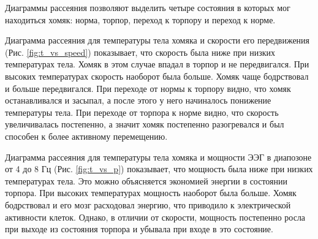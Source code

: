 \documentclass[12pt,a4paper,oneside]{article}
\begin{document}
Диаграммы рассеяния позволяют выделить четыре состояния в которых мог находиться хомяк: норма, торпор, переход к торпору и переход к норме. 

Диаграмма рассеяния для температуры тела хомяка и скорости его передвижения (Рис. \ref{fig:t_vs_speed}) показывает, что скорость была ниже при низких температурах тела. Хомяк в этом случае впадал в торпор и не передвигался. При высоких температурах скорость наоборот была больше. Хомяк чаще бодрствовал и больше передвигался. При переходе от нормы к торпору видно, что хомяк останавливался и засыпал, а после этого у него начиналось понижение температуры тела. При переходе от торпора к норме видно, что скорость увеличивалась постепенно, а значит хомяк постепенно разогревался и был способен к более активному перемещению. 

Диаграмма рассеяния для температуры тела хомяка и мощности ЭЭГ в диапозоне от 4 до 8 Гц (Рис. \ref{fig:t_vs_p}) показывает, что мощность была ниже при низких температурах тела. Это можно объясняется экономией энергии в состоянии торпора. При высоких температурах мощность наоборот была больше. Хомяк бодрствовал и его мозг расходовал энергию, что приводило к электрической активности клеток. Однако, в отличии от скорости, мощность постепенно росла при выходе из состояния торпора и убывала при входе в это состояние. 
\end{document}
